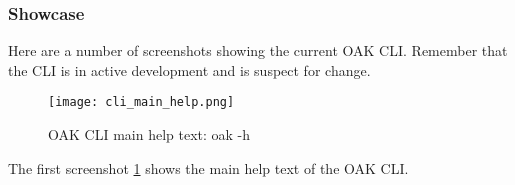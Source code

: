 \subsubsection{Showcase}

Here are a number of screenshots showing the current OAK CLI.
Remember that the CLI is in active development and is suspect for change.

\begin{figure}[h]
    \begin{adjustwidth}{-0.1\paperwidth}{-0.1\paperwidth}
        \centering
        \texttt{[image: cli\_main\_help.png]}
        \caption{OAK CLI main help text: oak -h}
        \label{fig:cli_main_help}
    \end{adjustwidth}
\end{figure}

The first screenshot \ref{fig:cli_main_help} shows the main help text of the OAK CLI.